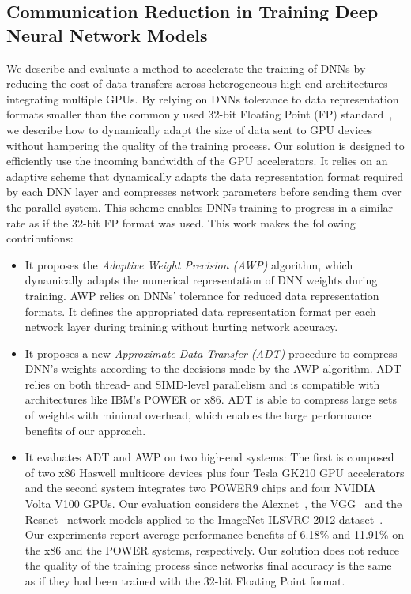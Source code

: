 \subsection{Communication Reduction in Training Deep Neural Network Models}
We describe and evaluate a method to accelerate the training of DNNs by reducing 
the cost of data transfers across heterogeneous high-end architectures 
integrating multiple GPUs. By relying on DNNs tolerance to data representation 
formats smaller than the commonly used 32-bit Floating Point (FP) 
standard~\cite{gupta15, flexpoint17}, we describe how to dynamically adapt the 
size of data sent to GPU devices without hampering the quality of the training 
process.  Our solution is designed to efficiently use the incoming bandwidth of 
the GPU accelerators.
It relies on an adaptive scheme that dynamically adapts the data representation 
format required by each DNN layer and compresses network parameters before 
sending them over the parallel system.
This scheme enables DNNs training to progress in a similar rate as if the 32-bit 
FP format was used.
This work makes the following contributions:
\begin{itemize}
    \item It proposes the {\it Adaptive Weight Precision (AWP)} algorithm, which 
        dynamically adapts the numerical representation of DNN weights during 
        training.  AWP relies on DNNs' tolerance for reduced data representation 
        formats.  It defines the appropriated data representation format per 
        each network layer during  training without hurting network accuracy.

    \item It proposes a new {\it Approximate Data Transfer (ADT)} procedure to 
        compress DNN's weights according to the decisions made by the AWP 
        algorithm.  ADT relies on both thread- and SIMD-level parallelism  and 
        is compatible with architectures like IBM's POWER or x86. ADT is able to 
        compress large sets of weights with minimal overhead, which enables the 
        large performance benefits of our approach.

    \item It evaluates ADT and AWP on two high-end systems: The first is 
        composed of two x86 Haswell multicore devices plus four Tesla GK210 GPU 
        accelerators and the second system integrates two POWER9 chips and four 
        NVIDIA Volta V100 GPUs.  Our evaluation considers the 
        Alexnet~\cite{alexnet}, the VGG~\cite{vgg} and the Resnet~\cite{resnet} 
        network models applied to the ImageNet ILSVRC-2012 
        dataset~\cite{imagenet}.
        Our experiments report average performance benefits of 6.18\% and 
        11.91\% on the x86 and the POWER systems, respectively.
        Our solution does not reduce the quality of the training process since 
        networks final accuracy is the same as if they had been trained with the 
        32-bit Floating Point format.
\end{itemize}

